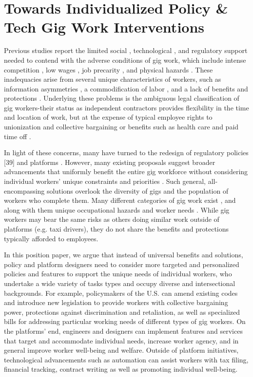 \chapter{Towards Individualized Policy \& Tech Gig Work Interventions}
Previous studies report the limited social \cite{atom,Kuhn2019-fi,Wood2019-jp}, technological \cite{Li2022-hd,platform_manage}, and regulatory \cite{Dubal2019-qi,Hardy2022-xd,Graham2017-zw,Tan2021-li,Stewart2017-bs} support needed to contend with the adverse conditions of gig work, which include intense competition \cite{bates2021lessons,boundary}, low wages \cite{Friedman2014-cz,Kalleberg_undated-sb,good}, job precarity \cite{Ashford2018-dw,precarity}, and physical hazards \cite{Bajwa2018-gy,Howard2017-wd}. These inadequacies arise from several unique characteristics of workers, such as information asymmetries \cite{Jarrahi2019-if,platform_manage,zhang2022algmanagement,Kinder2019-pr}, a commodification of labor \cite{Stefano_undated-dw,Wood2019-jp}, and a lack of benefits and protections \cite{muntaner2018digital,Luckett_undated-qr}. Underlying these problems is the ambiguous legal classification of gig workers-their status as independent contractors provides flexibility in the time and location of work, but at the expense of typical employee rights to unionization and collective bargaining or benefits such as health care and paid time off \cite{category}.

In light of these concerns, many have turned to the redesign of regulatory policies [39] and platforms \cite{arnoldi2021mapping,Jabagi2019-dt}. However, many existing proposals suggest broader advancements that uniformly benefit the entire gig workforce without considering individual workers' unique constraints and priorities \cite{codesign}. Such general, all-encompassing solutions overlook the diversity of gigs and the population of workers who complete them. Many different categories of gig work exist \cite{Duggan2020-qh}, and along with them unique occupational hazards and worker needs  \cite{Bajwa2018-gy}. While gig workers may bear the same risks as others doing similar work outside of platforms (e.g. taxi drivers), they do not share the benefits and protections typically afforded to employees. 

In this position paper, we argue that instead of universal benefits and solutions, policy and platform designers need to consider more targeted and personalized policies and features to support the unique needs of individual workers, who undertake a wide variety of tasks types and occupy diverse and intersectional backgrounds. For example, policymakers of the U.S. can amend existing codes and introduce new legislation to provide workers with collective bargaining power, protections against discrimination and retaliation, as well as specialized bills for addressing particular working needs of different types of gig workers. On the platforms' end, engineers and designers can implement features and services that target and accommodate individual needs, increase worker agency, and in general improve worker well-being and welfare. Outside of platform initiatives, technological advancements such as automation can assist workers with tax filing, financial tracking, contract writing as well as promoting individual well-being.

